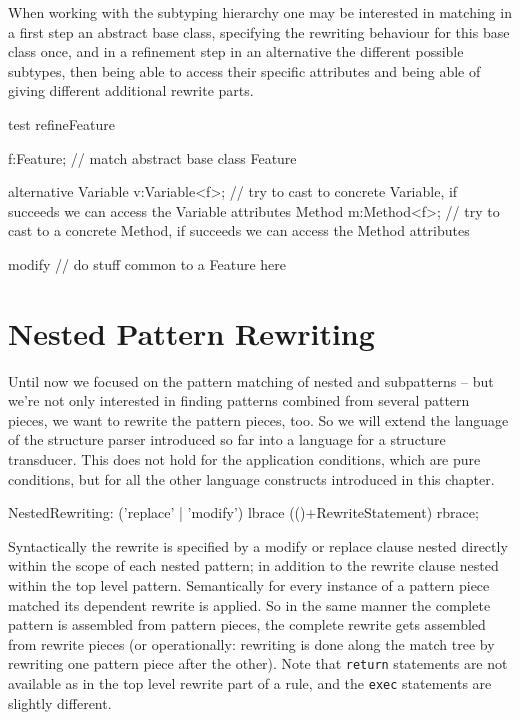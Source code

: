 \begin{example} \label{ex:retypelhs}
When working with the subtyping hierarchy one may be interested in matching in a first step an abstract base class,
specifying the rewriting behaviour for this base class once,
and in a refinement step in an alternative the different possible subtypes, 
then being able to access their specific attributes and being able of giving different additional rewrite parts.
	\begin{grgen}
test refineFeature
{
  f:Feature; // match abstract base class Feature

  alternative {
    Variable {
      v:Variable<f>; // try to cast to concrete Variable, if succeeds we can access the Variable attributes
    }
    Method {
      m:Method<f>; // try to cast to a concrete Method, if succeeds we can access the Method attributes
    }
  }
  
  modify {
    // do stuff common to a Feature here
  }
}
	\end{grgen}
\end{example}


\section{Nested Pattern Rewriting}
\label{sec:nestedrewrite}

Until now we focused on the pattern matching of nested and subpatterns -- but we're not only interested in finding patterns combined from several pattern pieces, we want to rewrite the pattern pieces, too.
So we will extend the language of the structure parser introduced so far into a language for a structure transducer.
This does not hold for the application conditions, which are pure conditions, but for all the other language constructs introduced in this chapter.

\begin{rail}  
  NestedRewriting: ('replace' | 'modify') lbrace (()+RewriteStatement) rbrace;
\end{rail}

Syntactically the rewrite is specified by a modify or replace clause nested directly within the scope of each nested pattern;
in addition to the rewrite clause nested within the top level pattern.
Semantically for every instance of a pattern piece matched its dependent rewrite is applied. 
So in the same manner the complete pattern is assembled from pattern pieces, the complete rewrite gets assembled from rewrite pieces
(or operationally: rewriting is done along the match tree by rewriting one pattern piece after the other).
Note that \texttt{return} statements are not available as in the top level rewrite part of a rule, and the \texttt{exec} statements are slightly different.


